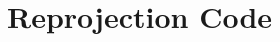 \documentclass[tocnosub,noragright,centerchapter,fullpagesingle,12pt]{uiuc_csthesis21}
\theoremstyle{definition}
\numberwithin{algocf}{chapter}     %
\begin{document}
%


%
\appendix

\chapter{Reprojection Code}
\label{apx:reproj}



\backmatter
\end{document}

